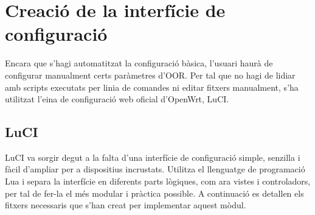 \documentclass[11pt]{article}
\begin{document}
\section{Creació de la interfície de configuració}
Encara que s’hagi automatitzat la configuració bàsica, l’usuari haurà de configurar manualment certs paràmetres d’OOR. Per tal que no hagi de lidiar amb scripts executats per linia de comandes ni editar fitxers manualment, s’ha utilitzat l’eina de configuració web oficial d’OpenWrt, LuCI.
\subsection{LuCI}
LuCI va sorgir degut a la falta d’una interfície de configuració simple, senzilla i fàcil d’ampliar per a dispositius incrustats. Utilitza el llenguatge de programació Lua i separa la interfície en diferents parts lògiques, com ara vistes i controladors, per tal de fer-la el més modular i pràctica possible.
A continuació es detallen els fitxers necessaris que s’han creat per implementar aquest mòdul.
\end{document}

